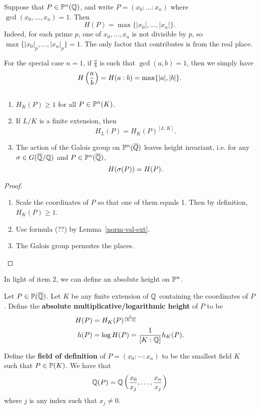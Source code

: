 \begin{ex}\label{qheight}
Suppose that $P\in \mathbb{P}^n(\mathbb{Q})$, and write $P=(x_0:\ldots :x_n)$ where $\gcd(x_0,\ldots, x_n)=1$. Then   
\[
H(P)=\max\{|x_0|,\ldots, |x_n|\}.
\]
Indeed, for each prime $p$, one of $x_0,\ldots, x_n$ is not divisible by $p$, so $\max\{|x_0|_p,\ldots, |x_n|_p\}=1$. The only factor that contributes is from the real place.

For the special case $n=1$, if $\frac ab$ is such that $\gcd(a,b)=1$, then we simply have 
\[
H\left( {\frac{a}{b}} \right)=H(a:b)=\max\{|a|,|b|\}.
\]
\end{ex}
\begin{pr}$\,$
\begin{enumerate}\label{elem-height}
\item $H_K(P)\ge 1$ for all $P\in \mathbb{P}^n(K)$.
\item If $L/K$ is a finite extension, then
\[
H_{L}(P)=H_K(P)^{[L:K]}.
\]
\item The action of the Galois group on $\mathbb{P}^n(\overline{Q})$ leaves height invariant, i.e. for any $\sigma\in G(\overline{\mathbb{Q}}/{\mathbb{Q}})$ and $P\in \mathbb{P}^n(\overline{\mathbb{Q}})$, 
\[H(\sigma(P))=H(P).\]
\end{enumerate}
\begin{proof}$\,$
\begin{enumerate}
\item
Scale the coordinates of $P$ so that one of them equals 1. Then by definition, $H_K(P)\ge 1$.
\item
Use formula (??) by Lemma~\ref{norm-val-ext}.
\item
The Galois group permutes the places.
\qedhere
\end{enumerate}
\end{proof}
\end{pr}
In light of item 2, we can define an absolute height on $\mathbb{P}^n$.
\begin{df}
Let $P\in \mathbb{P}(\overline{\mathbb{Q}})$. Let $K$ be any finite extension of $\mathbb{Q}$ containing the coordinates of $P$. Define the \textbf{absolute multiplicative/logarithmic height} of $P$ to be
\begin{align*}
H(P)&=H_K(P)^{\frac{1}{[K:\mathbb{Q}]}}\\
h(P)&=\log H(P)=\frac{1}{[K:\mathbb{Q}]}h_K(P).
\end{align*}
\end{df}
Define the \textbf{field of definition} of $P=(x_0:\cdots:x_n)$ to be the smallest field $K$ such that $P\in \mathbb{P}(K)$. We have that
\[
\mathbb{Q}(P)=\mathbb{Q}\left( {\frac{x_0}{x_j},\ldots, \frac{x_n}{x_j}} \right)
\]
where $j$ is any index such that $x_j\ne 0$.
